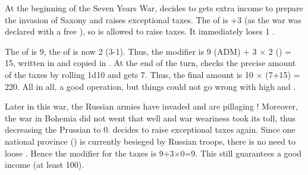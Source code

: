 \begin{exemple}
  At the beginning of the Seven Years War,  decides to
  gets extra income to prepare the invasion of Saxony and raises exceptional
  taxes. The \STAB of \PRU is +3 (as the war was declared with a free \CB), so
  \PRU is allowed to raise taxes. It immediately loses 1 \STAB.

  The \ADM of  is 9, the \STAB of \PRU is now 2
  (3-1). Thus, the modifier is 9 (ADM) + 3 $\times$ 2 (\STAB) = 15, written in
   and copied in
  . At the end of the turn, \PRU
  checks the precise amount of the taxes by rolling 1d10 and gets 7. Thus, the
  final amount is 10 $\times$ (7+15) = 220\ducats. All in all, a good
  operation, but things could not go wrong with high \STAB and \ADM.

  \smallskip

  Later in this war, the Russian armies have invaded \provinceBrandenburg and
  are pillaging \villeBerlin! Moreover, the war in Bohemia did not went that
  well and war weariness took its toll, thus decreasing the Prussian \STAB to
  0.  decides to raise exceptional taxes again. Since
  one national province (\provinceBrandenburg) is currently besieged by
  Russian troops, there is no need to loose \STAB. Hence the modifier for the
  taxes is 9+3$\times$0=9. This still guarantees a good income (at least
  100\ducats).
\end{exemple}

